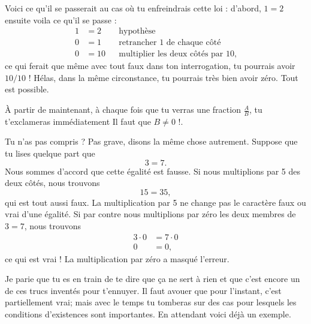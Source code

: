 \documentclass[a4paper,12pt]{book}
\theoremstyle{mes_exemples}	\newtheorem{exemple}[numtho]{Exemple}
\theoremstyle{mes_tho}
\begin{document}
Voici ce qu'il se passerait au cas où tu enfreindrais cette loi : d'abord, $1=2$ ensuite voila ce qu'il se passe :
\begin{subequations}
\begin{align}
1&=2&&\text{hypothèse}\\
0&=1&&\text{retrancher $1$ de chaque côté}\\
0&=10&&\text{multiplier les deux côtés par 10},
\end{align}
\end{subequations}
ce qui ferait que même avec tout faux dans ton interrogation, tu pourrais avoir $10/10$ ! Hélas, dans la même circonstance, tu pourrais très bien avoir zéro. Tout est possible.

À partir de maintenant, à chaque fois que tu verras une fraction $\frac{ A }{ B }$, tu t'exclameras immédiatement \og Il faut que $B\neq 0$ !\fg.

Tu n'as pas compris ? Pas grave, disons la même chose autrement. Suppose que tu lises quelque part que
\[ 
  3=7.
\]
Nous sommes d'accord que cette égalité est fausse. Si nous multiplions par 5 des deux côtés, nous trouvons
\[ 
  15=35,
\]
qui est tout aussi faux. La multiplication par 5 ne change pas le caractère faux ou vrai d'une égalité. Si par contre nous multiplions par zéro les deux membres de $3=7$, nous trouvons
\begin{align*}
3\cdot 0&=7\cdot 0\\
  0&=0,
\end{align*}
ce qui est vrai ! La multiplication par zéro a masqué l'erreur.

Je parie que tu es en train de te dire que ça ne sert à rien et que c'est encore un de ces trucs inventés pour t'ennuyer. Il faut avouer que pour l'instant, c'est partiellement vrai; mais avec le temps tu tomberas sur des cas pour lesquels les conditions d'existences sont importantes. En attendant voici déjà un exemple.
\end{document}
